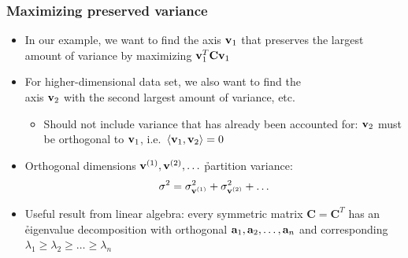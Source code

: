 \begin{frame}
  \frametitle{Maximizing preserved variance}

  \begin{itemize}
  \item In our example, we want to find the axis $\vv_1$ that preserves the
    largest amount of variance by maximizing $\vv_1^T \mathbf{C} \vv_1$
  \item<2-> For higher-dimensional data set, we also want to find the\\ axis
    $\vv_2$ with the second largest amount of variance, etc.
    \begin{itemize} 
    \item[\hand] Should not include variance that has already been accounted for:
      $\vv_2$ must be orthogonal to $\vv_1$, i.e.\ $\sprod{\vv_1}{\vv_2} = 0$
    \end{itemize}
  \item<3-> Orthogonal dimensions $\vv[1], \vv[2], \ldots$ \h{partition} variance:
    \[
    \sigma^2 = \sigma_{\vv[1]}^2 + \sigma_{\vv[2]}^2 + \ldots
    \]
  \item<4-> Useful result from linear algebra: every symmetric matrix
    $\mathbf{C} = \mathbf{C}^T$ has an \h{eigenvalue decomposition} with
    orthogonal  $\va_1, \va_2, \dots, \va_n$ and
    corresponding  $\lambda_1\geq \lambda_2\geq \dots \geq
    \lambda_n$
  \end{itemize}
\end{frame}

